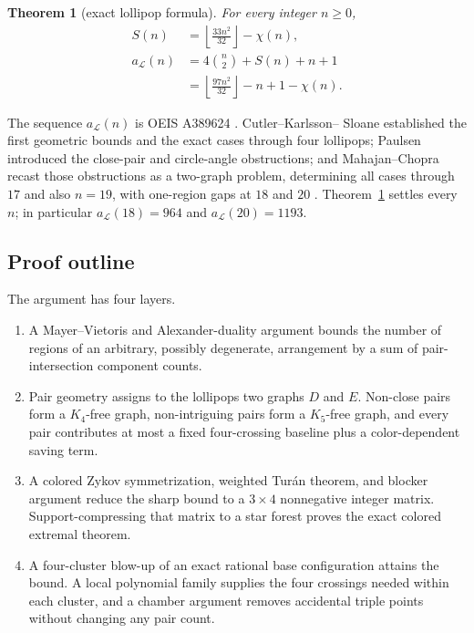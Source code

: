 \documentclass[11pt]{article}
\theoremstyle{plain}
\newtheorem{theorem}{Theorem}[section]
\theoremstyle{definition}
\theoremstyle{remark}
\newcommand{\Lop}{\mathcal L}
\newcommand{\1}{\mathbf 1}
\begin{document}
\begin{theorem}[exact lollipop formula]\label{thm:main}
For every integer $n\geq0$,
\begin{align}
 S(n)&=\left\lfloor\frac{33n^2}{32}\right\rfloor-\chi(n),
 \label{eq:Sclosed}\\
 a_{\Lop}(n)
 &=4\binom n2+S(n)+n+1 \label{eq:mainS}\\
 &=\left\lfloor\frac{97n^2}{32}\right\rfloor-n+1-\chi(n).
 \label{eq:main}
\end{align}
\end{theorem}

The sequence $a_{\Lop}(n)$ is OEIS A389624 \cite{OEIS}.  Cutler--Karlsson--
Sloane established the first geometric bounds and the exact cases through
four lollipops; Paulsen introduced the close-pair and circle-angle
obstructions; and Mahajan--Chopra recast those obstructions as a two-graph
problem, determining all cases through $17$ and also $n=19$, with one-region
gaps at $18$ and $20$ \cite{CKS,Paulsen,MahajanChopra}.  Theorem~\ref{thm:main}
settles every $n$; in particular $a_{\Lop}(18)=964$ and
$a_{\Lop}(20)=1193$.

\subsection*{Proof outline}
The argument has four layers.
\begin{enumerate}[label=(\roman*)]
\item A Mayer--Vietoris and Alexander-duality argument bounds the number of
regions of an arbitrary, possibly degenerate, arrangement by a sum of
pair-intersection component counts.
\item Pair geometry assigns to the lollipops two graphs $D$ and $E$.
Non-close pairs form a $K_4$-free graph, non-intriguing pairs form a
$K_5$-free graph, and every pair contributes at most a fixed four-crossing
baseline plus a color-dependent saving term.
\item A colored Zykov symmetrization, weighted Tur\'an theorem, and blocker
argument reduce the sharp bound to a $3\times4$ nonnegative integer matrix.
Support-compressing that matrix to a star forest proves the exact colored
extremal theorem.
\item A four-cluster blow-up of an exact rational base configuration attains
the bound.  A local polynomial family supplies the four crossings needed
within each cluster, and a chamber argument removes accidental triple
points without changing any pair count.
\end{enumerate}
\end{document}
